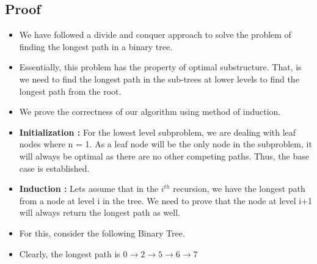 \documentclass[12pt]{article}
\begin{document}
\subsection{Proof}
\begin{itemize}
    \item We have followed a divide and conquer approach to solve the problem of finding the longest path in a binary tree.
    \item Essentially, this problem has the property of optimal substructure. That, is we need to find the longest path in the sub-trees at lower levels to find the longest path from the root.
    \item We prove the correctness of our algorithm using method of induction.
    \item \textbf{Initialization :} For the lowest level subproblem, we are dealing with leaf nodes where n = 1. As a leaf node will be the only node in the subproblem, it will always be optimal as there are no other competing paths. Thus, the base case is established.
    \item \textbf{Induction :} Lets assume that in the $i^{th}$ recursion, we have the longest path from a node at level i in the tree. We need to prove that the node at level i+1 will always return the longest path as well.
    \item For this, consider the following Binary Tree.
    \begin{center}
        \end{center}
    \item Clearly, the longest path is $0\rightarrow 2 \rightarrow 5 \rightarrow 6 \rightarrow 7$

\end{itemize}
\end{document}
